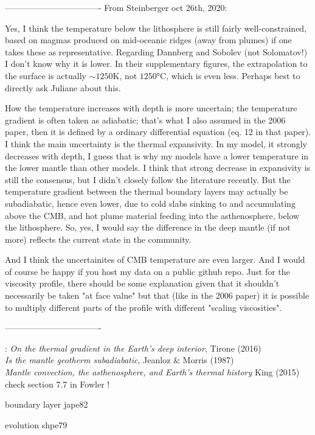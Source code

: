 ----------------------------------
From Steinberger oct 26th, 2020:

Yes, I think the temperature below the lithosphere is still fairly well-constrained, based on magmas produced on mid-oceanic ridges (away from plumes) if one takes these as representative. Regarding Dannberg and Sobolev (not Solomatov!) I don't know why it is lower. In their supplementary figures, the extrapolation to the surface is actually $\sim 1250\si{\kelvin}$, not $1250\si{\celsius}$, which is even less. Perhaps best to directly ask Juliane about this.

How the temperature increases with depth is more uncertain; the temperature gradient is often taken as adiabatic; that's what I also assumed in the 2006 paper, then it is defined by a ordinary differential equation (eq. 12 in that paper). I think the main uncertainty is the thermal expansivity. In my model, it strongly decreases with depth, I guess that is why my models have a lower temperature in the lower mantle than other models. I think that strong decrease in expansivity is still the consensus, but I didn't closely follow the literature recently. But the temperature gradient between the thermal boundary layers may actually be subadiabatic, hence even lower, due to cold slabs sinking to and accumulating above the CMB, and hot plume material feeding into the asthenosphere, below the lithosphere. So, yes, I would say the difference in the deep mantle (if not more) reflects the current state in the community.

And I think the uncertainites of CMB temperature are even larger. And I would of course be happy if you host my data on a public github repo. Just for the viscosity profile, there should be some explanation given that it shouldn't necessarily be taken "at face value" but that (like in the 2006 paper) it is possible to multiply different parts of the profile with different "scaling viscosities".

----------------------------------

\Literature: 
{\it On the thermal gradient in the Earth's deep interior}, Tirone (2016) \cite{tiro16} \\
{\it Is the mantle geotherm subadiabatic}, Jeanloz \& Morris (1987) \cite{jemo87} \\
{\it Mantle convection, the asthenosphere, and Earth's thermal history} King (2015) \cite{king15}\\

check section 7.7 in Fowler !

boundary layer jape82

evolution shpe79
